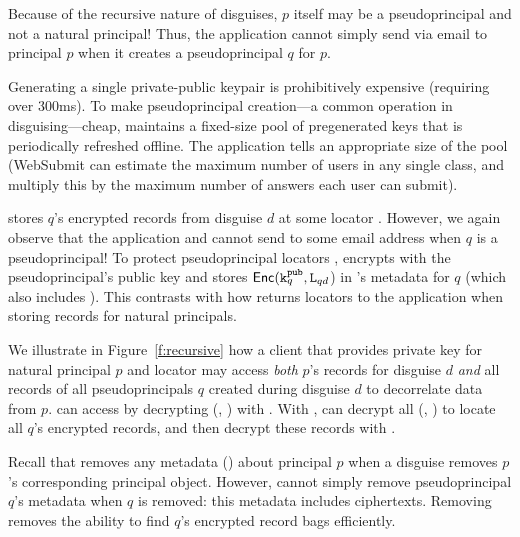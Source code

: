 Because of the recursive nature of disguises, $p$ itself may be a pseudoprincipal and not a natural
principal! Thus, the application cannot simply send  via \eg email to principal $p$ when it
creates a pseudoprincipal $q$ for $p$.

Generating a single private-public keypair is prohibitively expensive (requiring over 300ms). To
make pseudoprincipal creation---a common operation in disguising---cheap, \sys maintains a
fixed-size pool of pregenerated keys that is periodically refreshed offline. The application tells
\sys an appropriate size of the pool (\eg WebSubmit can estimate the maximum number of users in any
single class, and multiply this by the maximum number of answers each user can submit).

\sys stores $q$'s encrypted records from disguise $d$ at some locator .  However, we again
observe that the application and \sys cannot send  to some email address when $q$ is a
pseudoprincipal!  To protect pseudoprincipal locators , \sys encrypts  with the
pseudoprincipal's public key  and stores $\mathsf{Enc}(\texttt{\ensuremath{\texttt{k}^{\text{pub}}_{q}}}, \texttt{L}_{qd}$) in \sys's metadata for $q$ (which
also includes ). This contrasts with how \sys returns locators to the application when
storing records for natural principals.

We illustrate in Figure~\ref{f:recursive} how a client that provides private key  for
natural principal $p$ and locator  may access \emph{both} $p$'s records for disguise $d$
\emph{and} all records of all pseudoprincipals $q$ created during disguise $d$ to decorrelate data
from $p$.  \sys can access  by decrypting \enc(, ) with .  With
, \sys can decrypt all \enc(, ) to locate all $q$'s encrypted records,
and then decrypt these records with .


Recall that \sys removes any metadata (\eg {}) about principal $p$ when a disguise removes
$p$'s corresponding principal object.
However, \sys cannot simply remove pseudoprincipal $q$'s metadata when $q$ is removed: this metadata
includes  ciphertexts. Removing  removes the ability to find $q$'s encrypted
record bags efficiently.

